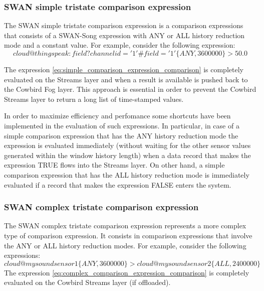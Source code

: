 \subsubsection{SWAN simple tristate comparison expression} 
The SWAN simple tristate comparison expression is a comparison expressions that consists of a SWAN-Song expression with ANY or ALL history reduction mode and a constant value. For example, consider the following expression:
\begin{equation}\label{eq:simple_comparison_expression_comparison}
cloud@thingspeak:field?channelid='1'\#field='1'\big\{ANY,3600000\big\} > 50.0
\end{equation}

The expression \ref{eq:simple_comparison_expression_comparison} is completely evaluated on the Streams layer and when a result is available is pushed back to the Cowbird Fog layer. This approach is essential in order to prevent the Cowbird Streams layer to return a long list of time-stamped values. 

In order to maximize efficiency and perfomance some shortcuts have been implemented in the evaluation of such expressions. In particular, in case of a simple comparison expression that has the ANY history reduction mode the expression is evaluated immediately (without waiting for the other sensor values generated within the window history length) when a data record that makes the expression TRUE flows into the Streams layer. On other hand, a simple comparison expression that has the ALL history reduction mode is immediately evaluated if a record that makes the expression FALSE enters the system.


\subsubsection{SWAN complex tristate comparison expression} 
The SWAN complex tristate comparison expression represents a more complex type of comparison expression. It consists in comparison expressions that involve the ANY or ALL history reduction modes. For example, consider the following expressions:
\begin{equation}\label{eq:complex_comparison_expression_comparison}
cloud@mysoundsensor1\big\{ANY, 3600000\big\} > cloud@mysoundsensor2\big\{ALL, 2400000\big\} 
\end{equation}
The expression \ref{eq:complex_comparison_expression_comparison} is completely evaluated on the Cowbird Streams layer (if offloaded).

